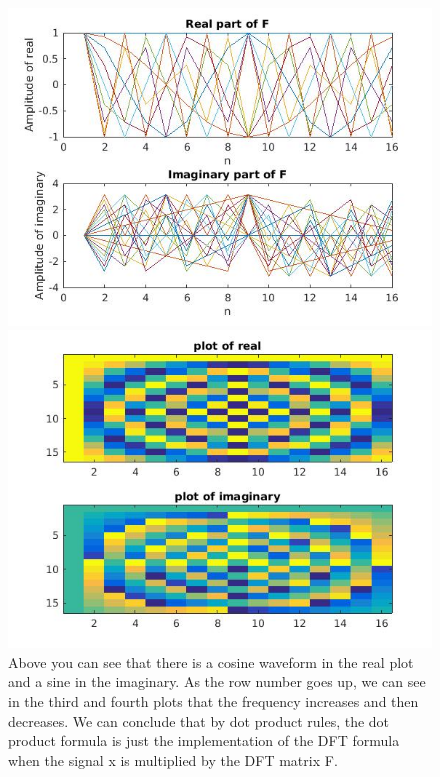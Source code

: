 \documentclass{article}
\begin{document}
\begin{figure}[H]
\includegraphics[scale =.4]{report4_1}
\includegraphics[scale =.4]{report4_2}
\\Above you can see that there is a cosine waveform in the real plot and a sine in the imaginary. As the row number goes up, we can see in the third and fourth plots that the frequency increases
 and then decreases. We can conclude that by dot product rules, the dot product formula is just the implementation of the DFT formula when the signal x is multiplied by the DFT matrix F.
\end{figure}
\end{document}
